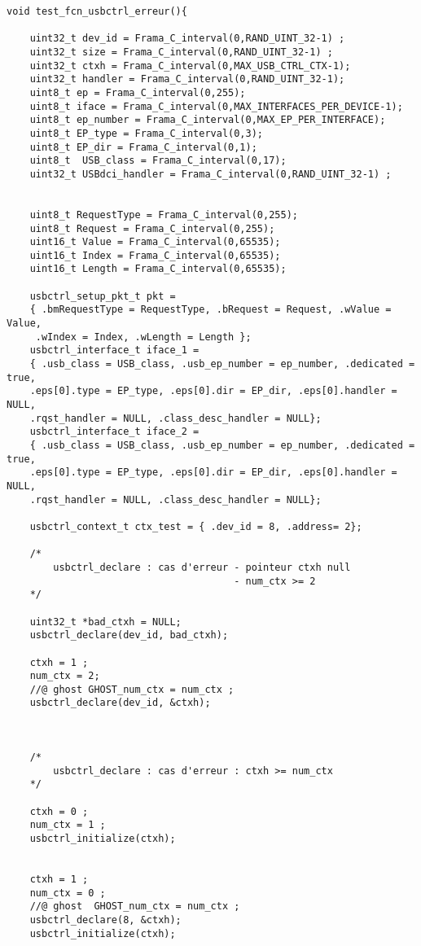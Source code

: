 \begin{lstlisting}[style=CStyle]
void test_fcn_usbctrl_erreur(){

    uint32_t dev_id = Frama_C_interval(0,RAND_UINT_32-1) ;
    uint32_t size = Frama_C_interval(0,RAND_UINT_32-1) ;
    uint32_t ctxh = Frama_C_interval(0,MAX_USB_CTRL_CTX-1);
    uint32_t handler = Frama_C_interval(0,RAND_UINT_32-1);
    uint8_t ep = Frama_C_interval(0,255);
    uint8_t iface = Frama_C_interval(0,MAX_INTERFACES_PER_DEVICE-1);
    uint8_t ep_number = Frama_C_interval(0,MAX_EP_PER_INTERFACE);
    uint8_t EP_type = Frama_C_interval(0,3);
    uint8_t EP_dir = Frama_C_interval(0,1);
    uint8_t  USB_class = Frama_C_interval(0,17);
    uint32_t USBdci_handler = Frama_C_interval(0,RAND_UINT_32-1) ;


    uint8_t RequestType = Frama_C_interval(0,255);
    uint8_t Request = Frama_C_interval(0,255);
    uint16_t Value = Frama_C_interval(0,65535);
    uint16_t Index = Frama_C_interval(0,65535);
    uint16_t Length = Frama_C_interval(0,65535);

    usbctrl_setup_pkt_t pkt =
    { .bmRequestType = RequestType, .bRequest = Request, .wValue = Value,
     .wIndex = Index, .wLength = Length };
    usbctrl_interface_t iface_1 =
    { .usb_class = USB_class, .usb_ep_number = ep_number, .dedicated = true,
    .eps[0].type = EP_type, .eps[0].dir = EP_dir, .eps[0].handler = NULL,
    .rqst_handler = NULL, .class_desc_handler = NULL};
    usbctrl_interface_t iface_2 =
    { .usb_class = USB_class, .usb_ep_number = ep_number, .dedicated = true,
    .eps[0].type = EP_type, .eps[0].dir = EP_dir, .eps[0].handler = NULL,
    .rqst_handler = NULL, .class_desc_handler = NULL};

    usbctrl_context_t ctx_test = { .dev_id = 8, .address= 2};

    /*
        usbctrl_declare : cas d'erreur - pointeur ctxh null
                                       - num_ctx >= 2
    */

    uint32_t *bad_ctxh = NULL;
    usbctrl_declare(dev_id, bad_ctxh);

    ctxh = 1 ;
    num_ctx = 2;
    //@ ghost GHOST_num_ctx = num_ctx ;
    usbctrl_declare(dev_id, &ctxh);



    /*
        usbctrl_declare : cas d'erreur : ctxh >= num_ctx
    */

    ctxh = 0 ;
    num_ctx = 1 ;
    usbctrl_initialize(ctxh);


    ctxh = 1 ;
    num_ctx = 0 ;
    //@ ghost  GHOST_num_ctx = num_ctx ;
    usbctrl_declare(8, &ctxh);
    usbctrl_initialize(ctxh);


\end{lstlisting}
